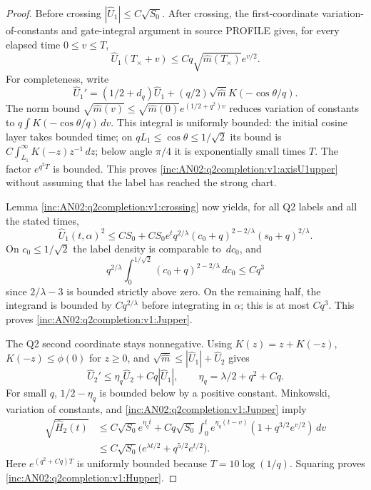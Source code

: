 \documentclass[11pt]{article}
\theoremstyle{remark}\newtheorem{remark}[theorem]{Remark}
\newcommand{\dd}{\,d}\newcommand{\E}{\mathbb E}
\begin{document}
\begin{proof}
Before crossing $|\widehat U_1|\le C\sqrt{S_0}$. After crossing, the first-coordinate variation-of-constants and gate-integral argument in source PROFILE gives, for every elapsed time $0\le v\le T$,
\begin{equation}\label{inc:AN02:q2completion:v1:axisU1upper}
 \widehat U_1(T_\times+v)\le C q\sqrt{\widehat m(T_\times)}e^{v/2}.
\end{equation}
For completeness, write
\[
 \widehat U_1'=(1/2+d_q)\widehat U_1
       +(q/2)\sqrt{\widehat m}K(-\cos\theta/q).
\]
The norm bound $\sqrt{\widehat m(v)}\le\sqrt{\widehat m(0)}e^{(1/2+q^2)v}$ reduces variation of constants to $q\int K(-\cos\theta/q)\dd v$. This integral is uniformly bounded: the initial cosine layer takes bounded time; on $qL_1\le\cos\theta\le1/\sqrt2$ its bound is $C\int_{L_1}^{\infty}K(-z)z^{-1}\dd z$; below angle $\pi/4$ it is exponentially small times $T$. The factor $e^{q^2T}$ is bounded. This proves \eqref{inc:AN02:q2completion:v1:axisU1upper} without assuming that the label has reached the strong chart.

Lemma \ref{inc:AN02:q2completion:v1:crossing} now yields, for all Q2 labels and all the stated times,
\[
 \widehat U_1(t,\alpha)^2\le C S_0+
 C S_0e^t q^{2/\lambda}(c_0+q)^{2-2/\lambda}(s_0+q)^{2/\lambda}.
\]
On $c_0\le1/\sqrt2$ the label density is comparable to $\dd c_0$, and
\[
 q^{2/\lambda}\int_0^{1/\sqrt2}(c_0+q)^{2-2/\lambda}\dd c_0\le Cq^3
\]
since $2/\lambda-3$ is bounded strictly above zero. On the remaining half, the integrand is bounded by $Cq^{2/\lambda}$ before integrating in $\alpha$; this is at most $Cq^3$. This proves \eqref{inc:AN02:q2completion:v1:Jupper}.

The Q2 second coordinate stays nonnegative. Using $K(z)=z+K(-z)$, $K(-z)\le\phi(0)$ for $z\ge0$, and $\sqrt{\widehat m}\le|\widehat U_1|+\widehat U_2$ gives
\[
 \widehat U_2'\le \eta_q\widehat U_2+Cq|\widehat U_1|,
 \qquad \eta_q=\lambda/2+q^2+Cq.
\]
For small $q$, $1/2-\eta_q$ is bounded below by a positive constant. Minkowski, variation of constants, and \eqref{inc:AN02:q2completion:v1:Jupper} imply
\begin{align*}
 \sqrt{\widehat H_2(t)}
 &\le C\sqrt{S_0}e^{\eta_qt}
 +Cq\sqrt{S_0}\int_0^t e^{\eta_q(t-v)}(1+q^{3/2}e^{v/2})\dd v\\
 &\le C\sqrt{S_0}\big(e^{\lambda t/2}+q^{5/2}e^{t/2}\big).
\end{align*}
Here $e^{(q^2+Cq)T}$ is uniformly bounded because $T=10\log(1/q)$. Squaring proves \eqref{inc:AN02:q2completion:v1:Hupper}.


\end{proof}
\end{document}

